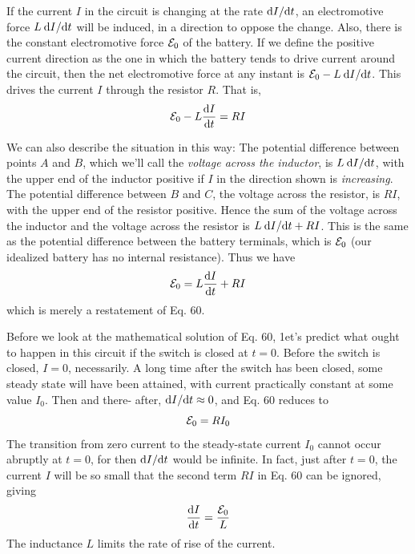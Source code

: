 If the current $I$ in the circuit is changing at the rate $\textup{d} I/\textup{d} t$, an electromotive
force $L\: \textup{d} I/\textup{d} t$ will be induced, in a direction to oppose the
change. Also, there is the constant electromotive force $\mathcal{E}_0$ of the
battery. If we define the positive current direction as the one in
which the battery tends to drive current around the circuit, then the
net electromotive force at any instant is $\mathcal{E}_0 - L\: \textup{d} I/\textup{d} t$. This drives
the current $I$ through the resistor $R$. That is,
\begin{equation}
  \mathcal{E}_0 - L\frac{\textup{d} I}{\textup{d} t} = RI
\end{equation}

We can also describe the situation in this way: The potential difference
between points $A$ and $B$, which we'll call the \emph{voltage across
the inductor}, is $L\: \textup{d} I/\textup{d} t$, with the upper end of the inductor positive
if $I$ in the direction shown is \emph{increasing}. The potential difference
between $B$ and $C$, the voltage across the resistor, is $RI$, with the upper
end of the resistor positive. Hence the sum of the voltage across the
inductor and the voltage across the resistor is $L\: \textup{d} I/\textup{d} t+RI$. This is
the same as the potential difference between the battery terminals,
which is $\mathcal{E}_0$ (our idealized battery has no internal resistance). Thus
we have
\begin{equation}
  \mathcal{E}_0 = L\frac{\textup{d} I}{\textup{d} t} + RI
\end{equation}
which is merely a restatement of Eq. 60.

Before we look at the mathematical solution of Eq. 60, 1et's predict
what ought to happen in this circuit if the switch is closed at $t = 0$.
Before the switch is closed, $I = 0$, necessarily. A long time after the
switch has been closed, some steady state will have been attained,
with current practically constant at some value $I_0$. Then and there-
after, $\textup{d} I/\textup{d} t\approx 0$, and Eq. 60 reduces to
\begin{equation}
  \mathcal{E}_0 = RI_0
\end{equation}
The transition from zero current to the steady-state current $I_0$ cannot
occur abruptly at $t = 0$, for then $\textup{d} I/\textup{d} t$ would be infinite. In fact,
just after $t = 0$, the current $I$ will be so small that the second term
$RI$ in Eq. 60 can be ignored, giving
\begin{equation}
  \frac{\textup{d} I}{\textup{d} t} = \frac{\mathcal{E}_0}{L}
\end{equation}
The inductance $L$ limits the rate of rise of the current.

